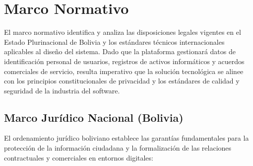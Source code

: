 \section{Marco Normativo}

El marco normativo identifica y analiza las disposiciones legales vigentes en el Estado Plurinacional de Bolivia y los estándares técnicos internacionales aplicables al diseño del sistema. Dado que la plataforma gestionará datos de identificación personal de usuarios, registros de activos informáticos y acuerdos comerciales de servicio, resulta imperativo que la solución tecnológica se alinee con los principios constitucionales de privacidad y los estándares de calidad y seguridad de la industria del software.

\subsection{Marco Jurídico Nacional (Bolivia)}

El ordenamiento jurídico boliviano establece las garantías fundamentales para la protección de la información ciudadana y la formalización de las relaciones contractuales y comerciales en entornos digitales:

